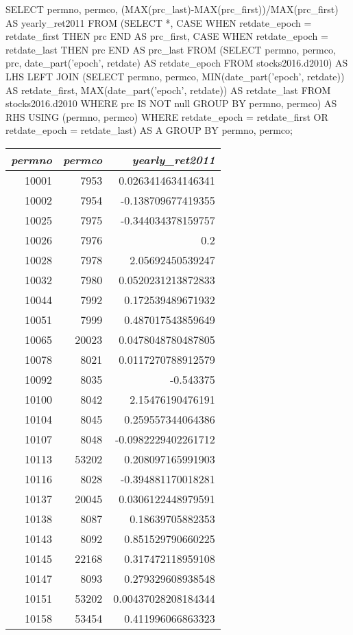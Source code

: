 SELECT permno, permco,
 (MAX(prc_last)-MAX(prc_first))/MAX(prc_first) AS yearly_ret2011
FROM
 (SELECT *,
   CASE
     WHEN retdate_epoch = retdate_first THEN prc
   END AS prc_first,
   CASE
     WHEN retdate_epoch = retdate_last THEN prc
   END AS prc_last
 FROM
   (SELECT permno, permco, prc,
     date_part('epoch', retdate) AS retdate_epoch
   FROM stocks2016.d2010) AS LHS
 LEFT JOIN
   (SELECT permno, permco,
     MIN(date_part('epoch', retdate)) AS retdate_first,
     MAX(date_part('epoch', retdate)) AS retdate_last
   FROM stocks2016.d2010
   WHERE prc IS NOT null 
   GROUP BY permno, permco) AS RHS
 USING (permno, permco)
 WHERE retdate_epoch = retdate_first OR retdate_epoch = retdate_last) AS A
GROUP BY permno, permco;
\begin{tabular}{r | r | r}
\textit{permno} & \textit{permco} & \textit{yearly\_ret2011} \\
\hline
10001 & 7953 & 0.0263414634146341 \\
10002 & 7954 & -0.138709677419355 \\
10025 & 7975 & -0.344034378159757 \\
10026 & 7976 & 0.2 \\
10028 & 7978 & 2.05692450539247 \\
10032 & 7980 & 0.0520231213872833 \\
10044 & 7992 & 0.172539489671932 \\
10051 & 7999 & 0.487017543859649 \\
10065 & 20023 & 0.0478048780487805 \\
10078 & 8021 & 0.0117270788912579 \\
10092 & 8035 & -0.543375 \\
10100 & 8042 & 2.15476190476191 \\
10104 & 8045 & 0.259557344064386 \\
10107 & 8048 & -0.0982229402261712 \\
10113 & 53202 & 0.208097165991903 \\
10116 & 8028 & -0.394881170018281 \\
10137 & 20045 & 0.0306122448979591 \\
10138 & 8087 & 0.18639705882353 \\
10143 & 8092 & 0.851529790660225 \\
10145 & 22168 & 0.317472118959108 \\
10147 & 8093 & 0.279329608938548 \\
10151 & 53202 & 0.00437028208184344 \\
10158 & 53454 & 0.411996066863323 \\

\end{tabular}
